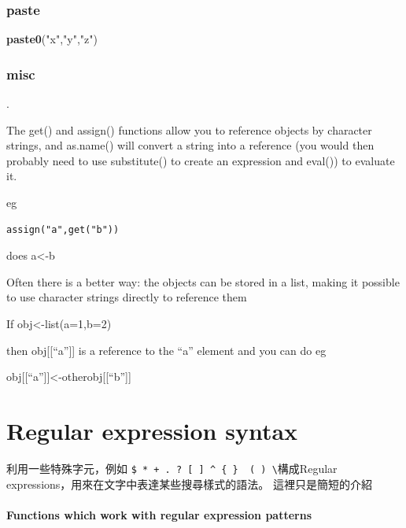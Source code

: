 \documentclass[]{book}
\newenvironment{Shaded}{\begin{snugshade}}{\end{snugshade}}
\newcommand{\KeywordTok}[1]{\textcolor[rgb]{0.13,0.29,0.53}{\textbf{#1}}}
\newcommand{\NormalTok}[1]{#1}
\newcommand{\StringTok}[1]{\textcolor[rgb]{0.31,0.60,0.02}{#1}}
\theoremstyle{definition}
\theoremstyle{definition}
\theoremstyle{definition}
\theoremstyle{remark}
\begin{document}
\hypertarget{paste}{%
\subsection{paste}\label{paste}}

\begin{Shaded}
\begin{Highlighting}[]
\KeywordTok{paste0}\NormalTok{(}\StringTok{"x"}\NormalTok{,}\StringTok{"y"}\NormalTok{,}\StringTok{"z"}\NormalTok{)}
\end{Highlighting}
\end{Shaded}

\hypertarget{misc}{%
\subsection{misc}\label{misc}}

.

The get() and assign() functions allow you to reference objects by
character strings, and as.name() will convert a string into a reference
(you would then probably need to use substitute() to create an
expression and eval()) to evaluate it.

eg

\begin{verbatim}
assign("a",get("b"))
\end{verbatim}

does a\textless{}-b

Often there is a better way: the objects can be stored in a list, making
it possible to use character strings directly to reference them

If obj\textless{}-list(a=1,b=2)

then obj{[}{[}``a''{]}{]} is a reference to the ``a'' element and you
can do eg

obj{[}{[}``a''{]}{]}\textless{}-otherobj{[}{[}``b''{]}{]}

\hypertarget{regular-expression-syntax}{%
\chapter{Regular expression syntax}\label{regular-expression-syntax}}

利用一些特殊字元，例如
\texttt{\$\ *\ +\ .\ ?\ {[}\ {]}\ \^{}\ \{\ \}\ \textbar{}\ (\ )\ \textbackslash{}}構成Regular
expressions，用來在文字中表達某些搜尋樣式的語法。 這裡只是簡短的介紹

\hypertarget{functions-which-work-with-regular-expression-patterns}{%
\subsubsection{Functions which work with regular expression
patterns}\label{functions-which-work-with-regular-expression-patterns}}
\end{document}

